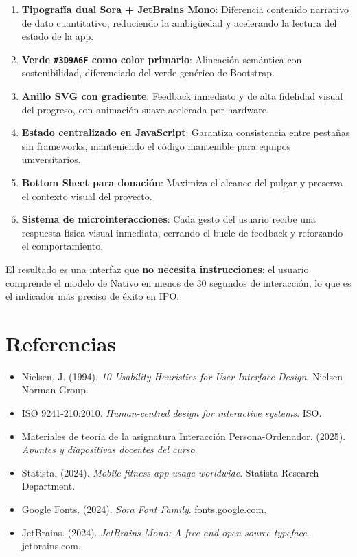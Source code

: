 \documentclass[12pt, a4paper]{article}
\begin{document}
\begin{enumerate}[leftmargin=*, itemsep=6pt]
  \item \textbf{Tipografía dual Sora + JetBrains Mono}: Diferencia contenido narrativo de dato cuantitativo, reduciendo la ambigüedad y acelerando la lectura del estado de la app.
  \item \textbf{Verde \texttt{\#3D9A6F} como color primario}: Alineación semántica con sostenibilidad, diferenciado del verde genérico de Bootstrap.
  \item \textbf{Anillo SVG con gradiente}: Feedback inmediato y de alta fidelidad visual del progreso, con animación suave acelerada por hardware.
  \item \textbf{Estado centralizado en JavaScript}: Garantiza consistencia entre pestañas sin frameworks, manteniendo el código mantenible para equipos universitarios.
  \item \textbf{Bottom Sheet para donación}: Maximiza el alcance del pulgar y preserva el contexto visual del proyecto.
  \item \textbf{Sistema de microinteracciones}: Cada gesto del usuario recibe una respuesta física-visual inmediata, cerrando el bucle de feedback y reforzando el comportamiento.
\end{enumerate}

El resultado es una interfaz que \textbf{no necesita instrucciones}: el usuario comprende el modelo de Nativo en menos de 30 segundos de interacción, lo que es el indicador más preciso de éxito en IPO.



\newpage
\section*{Referencias}

\begin{itemize}[leftmargin=*]

  \item Nielsen, J. (1994). \textit{10 Usability Heuristics for User Interface Design}. Nielsen Norman Group.
  \item ISO 9241-210:2010. \textit{Human-centred design for interactive systems}. ISO.
  \item Materiales de teoría de la asignatura Interacción Persona-Ordenador. (2025). \textit{Apuntes y diapositivas docentes del curso}.
  \item Statista. (2024). \textit{Mobile fitness app usage worldwide}. Statista Research Department.
  \item Google Fonts. (2024). \textit{Sora Font Family}. fonts.google.com.
  \item JetBrains. (2024). \textit{JetBrains Mono: A free and open source typeface}. jetbrains.com.
\end{itemize}
\end{document}
